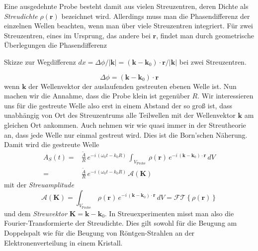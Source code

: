 Eine ausgedehnte Probe besteht damit aus vielen Streuzentren, deren Dichte als \emph{Streudichte} $\rho(\mathbf{r})$ bezeichnet wird. Allerdings muss man die Phasendifferenz der einzelnen Wellen beachten, wenn man über viele Streuzentren integriert. Für zwei Streuzentren, eines im Ursprung, das andere bei $\mathbf{r}$, findet man durch geometrische Überlegungen die Phasendifferenz
%
\begin{marginfigure}
\caption{Skizze zur  Wegdifferenz $dx =  \Delta \phi / | \mathbf{k}|=  ( \mathbf{k} - \mathbf{k}_0 ) \cdot \mathbf{r} / |\mathbf{k}| $ bei zwei Streuzentren.}
\end{marginfigure}
%
\begin{equation}
\Delta \phi = ( \mathbf{k} - \mathbf{k}_0 ) \cdot \mathbf{r}
\end{equation}
wenn $\mathbf{k}$ der Wellenvektor der auslaufenden gestreuten ebenen Welle ist. Nun machen wir die Annahme, dass die Probe klein ist gegenüber $R$. Wir interessieren uns für die gestreute Welle also erst in einem Abstand der so groß ist, dass unabhängig von Ort des Streuzentrums alle Teilwellen mit der Wellenvektor $\mathbf{k}$ am gleichen Ort ankommen. Auch nehmen wir wie quasi immer in der Streutheorie an, dass jede Welle nur einmal gestreut wird. Dies ist die  Born'schen Näherung. Damit wird die gestreute Welle
\begin{align}
 A_S(t) = & \frac{\tilde{A}}{R} \,   e^{- i \, (\omega_0 t - k_0 R)} \,
  \int_{V_\text{Probe}} \, \rho( \mathbf{r}) \,   e^{- i \,  ( \mathbf{k} - \mathbf{k}_0 ) \cdot \mathbf{r}} \, dV \\
  = & \frac{\tilde{A}}{R} \,   e^{- i \, (\omega_0 t - k_0 R)} \, \mathcal{A}(\mathbf{K})
\end{align}
mit der \emph{Streuamplitude} 
\begin{equation}
\mathcal{A}(\mathbf{K}) =  \int_{V_\text{Probe}} \, \rho( \mathbf{r}) \,   e^{- i \,  ( \mathbf{k} - \mathbf{k}_0 ) \cdot \mathbf{r}} \, dV  = \mathcal{FT} \left\{ \rho( \mathbf{r})  \right\} \label{eq:rezi_streuamplitude}
\end{equation}
und dem \emph{Streuvektor} $\mathbf{K} = \mathbf{k} - \mathbf{k}_0$. In Streuexperimenten misst man also die Fourier-Transformierte der Streudichte. Dies gilt sowohl für die Beugung am Doppelspalt wie für die Beugung von Röntgen-Strahlen an der Elektronenverteilung in einem Kristall. 

